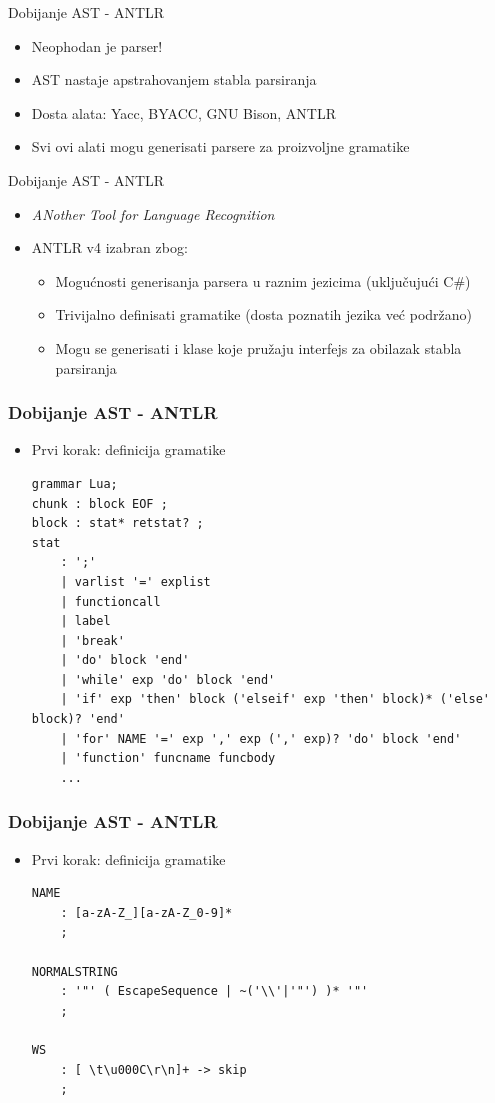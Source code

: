 \documentclass{beamer}
\begin{document}
\begin{frame}{Dobijanje AST - ANTLR}
    \begin{itemize}
        \item Neophodan je parser!
        \item AST nastaje apstrahovanjem stabla parsiranja
        \item Dosta alata: Yacc, BYACC, GNU Bison, ANTLR
        \item Svi ovi alati mogu generisati parsere za proizvoljne gramatike
    \end{itemize}
\end{frame}

\begin{frame}{Dobijanje AST - ANTLR}
    \begin{itemize}
        \item \emph{ANother Tool for Language Recognition}
        \item ANTLR v4 izabran zbog:
        \begin{itemize}
            \item Mogu\'cnosti generisanja parsera u raznim jezicima (uklju\v{c}uju\'c{}i C\#)
            \item Trivijalno definisati gramatike (dosta poznatih jezika ve\'c{} podr\v{z}ano)
            \item Mogu se generisati i klase koje pru\v{z}aju interfejs za obilazak stabla parsiranja
        \end{itemize}
    \end{itemize}
\end{frame}

\begin{frame}[fragile]
\frametitle{Dobijanje AST - ANTLR}
    \begin{itemize}
        \item Prvi korak: definicija gramatike
\begin{lstlisting}[language={}]
grammar Lua;
chunk : block EOF ;
block : stat* retstat? ;
stat
    : ';'
    | varlist '=' explist
    | functioncall
    | label
    | 'break'
    | 'do' block 'end'
    | 'while' exp 'do' block 'end'
    | 'if' exp 'then' block ('elseif' exp 'then' block)* ('else' block)? 'end'
    | 'for' NAME '=' exp ',' exp (',' exp)? 'do' block 'end'
    | 'function' funcname funcbody
    ...
\end{lstlisting}
    \end{itemize}
\end{frame}

\begin{frame}[fragile]
    \frametitle{Dobijanje AST - ANTLR}
    \begin{itemize}
        \item Prvi korak: definicija gramatike
\begin{lstlisting}[language={}]
NAME
    : [a-zA-Z_][a-zA-Z_0-9]*
    ;

NORMALSTRING
    : '"' ( EscapeSequence | ~('\\'|'"') )* '"' 
    ;

WS  
    : [ \t\u000C\r\n]+ -> skip
    ;
\end{lstlisting}
    \end{itemize}
\end{frame}
\end{document}

